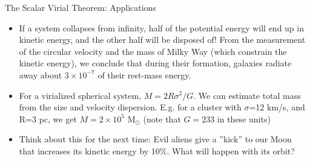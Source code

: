 \documentclass[letterpaper,landscape]{slides}
\begin{document}
\begin{slide}
\begin{center}
\vskip 1.5in
\end{center}

\vfill
\end{slide}




\begin{slide}
\begin{center}
{\large \color{red} 
                    The Scalar Virial Theorem: Applications  }
\end{center}

\begin{itemize}
\item 
If a system collapses from infinity, half of the potential
energy will end up in kinetic energy, and the other half
will be disposed of! From the measurement of the circular
velocity and the mass of Milky Way (which constrain 
the kinetic energy), we conclude that during their formation,
galaxies radiate away about $3\times10^{-7}$ of their
rest-mass energy.
\item
For a virialized spherical system, $M = 2 R \sigma^2 / G$. 
We can estimate total mass from the size and velocity dispersion.
E.g. for a cluster with $\sigma$=12 km/s, and R=3 pc, 
we get $M = 2\times 10^5$ M$_\odot$ (note that $G=233$ in 
these units)
\item 
{\color{red} Think about this for the next time:} Evil aliens
give a ''kick'' to our Moon that increases its kinetic energy
by 10\%. What will happen with its orbit? 
\end{itemize}     

\vfill
\end{slide}
\end{document}
